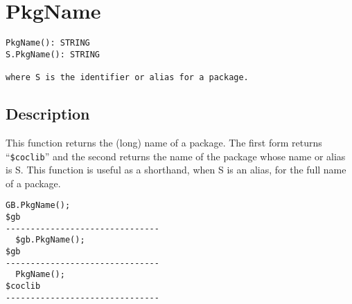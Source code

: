 \documentclass[a4paper]{mybook}
\newenvironment{command}{}{} %
\begin{document}
\section{PkgName}
\label{PkgName}
\begin{command} %


\begin{Verbatim}[label=syntax, rulecolor=\color{MidnightBlue},
frame=single]
PkgName(): STRING
S.PkgName(): STRING

where S is the identifier or alias for a package.
\end{Verbatim}


\subsection*{Description}

This function returns the (long) name of a package.  The first form
returns ``\verb&$coclib&'' and the second returns the name of the package
whose name or alias is S.  This function is useful as a shorthand,
when S is an alias, for the full name of a package.
\begin{Verbatim}[label=example, rulecolor=\color{PineGreen}, frame=single]
  GB.PkgName();
$gb
-------------------------------
  $gb.PkgName();
$gb
-------------------------------
  PkgName();
$coclib
-------------------------------
\end{Verbatim}


\end{command} %
\end{document}
